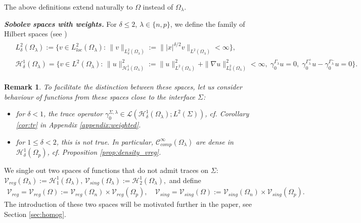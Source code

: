 \documentclass[report]{elsarticle}
\newtheorem{remark}[theorem]{Remark}
\numberwithin{theorem}{section}
\newcommand{\re}{\varepsilon}
\begin{document}
The above definitions extend naturally to $\Omega$ instead of $\Omega_{\lambda}$. 

\textit{\textbf{Sobolev spaces with weights.}} For $\delta\leq 2$, $\lambda\in \{n,p\}$, we define the family of Hilbert spaces (see  \cite[Theorem 1.3, Theorem 1.11 and its proof]{kufner1984define})
\begin{align}
	\label{eq:wsp}
	\begin{split}
		&L^2_{\delta}(\Omega_{\lambda}):=\{v\in L^2_{loc}(\Omega_{\lambda}): \, \|v\|_{L^2_{\delta}(\Omega_{\lambda})}:=\||x|^{\delta/2}v\|_{L^2(\Omega_{\lambda})}<\infty\},\\
		&\mathcal{H}^1_{\delta}(\Omega_{\lambda})=\{v\in L^2(\Omega_{\lambda}): \, \|u\|_{\mathcal{H}^1_{\delta}(\Omega_{\lambda})}^2:=\|u\|^2_{L^2(\Omega_{\lambda})}+\|\nabla u\|^2_{L^2_{\delta}(\Omega_{\lambda})}<\infty, \; \gamma_0^{\Gamma_{\lambda}}u=0,\;
		\gamma_0^{\Gamma_{\lambda}^+}u-\gamma_0^{\Gamma_{\lambda}^{-}}u=0\}.
	\end{split}
\end{align}
\begin{remark}
	To facilitate the distinction between these spaces, let us consider behaviour of functions from these spaces close to the interface $\Sigma$:
	\begin{itemize}
		\item for $\delta<1$, the trace operator $\gamma_0^{\Sigma,\lambda}\in \mathcal{L}(\mathcal{H}^1_{\delta}(\Omega_{\lambda}); L^2(\Sigma))$, cf. Corollary \ref{cor:tr} in Appendix \ref{appendix:weighted}.
		\item for $1\leq \delta<2$, this is not true. In particular,  $\mathcal{C}^{\infty}_{comp}(\Omega_{\lambda})$ are dense in $\mathcal{H}^1_{\delta}(\Omega_p)$, cf. Proposition \ref{prop:density_vreg}.  
	\end{itemize}	
\end{remark}
%
%
We single out two spaces of functions that do not admit traces on $\Sigma$: 
$
\mathcal{V}_{reg}(\Omega_{\lambda}):=\mathcal{H}^1_{1}(\Omega_{\lambda}), \, \mathcal{V}_{sing}(\Omega_{\lambda}):=\mathcal{H}^1_{2}(\Omega_{\lambda}), 
$
and define
\begin{align}
	\label{eq:two_spaces}
	\mathcal{V}_{reg}=\mathcal{V}_{reg}(\Omega):=\mathcal{V}_{reg}(\Omega_{n})\times \mathcal{V}_{reg}(\Omega_p), \quad \mathcal{V}_{sing}=\mathcal{V}_{sing}(\Omega):=\mathcal{V}_{sing}(\Omega_{n})\times \mathcal{V}_{sing}(\Omega_p).
\end{align}	
The introduction of these two spaces will be motivated further in the paper, see Section \ref{sec:homog}.
\end{document}
